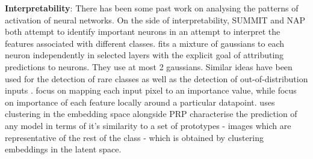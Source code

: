\documentclass{article}
\begin{document}
            \textbf{Interpretability}: There has been some past work on analysing the patterns of activation of neural networks. On the side of interpretability, SUMMIT \cite{hohman2019summitscalingdeeplearning} and NAP \cite{bauerle2022neuralactivationpatternsnaps} both attempt to identify important neurons in an attempt to interpret the features associated with different classes. \cite{stano2020explainingpredictionsdeepneural} fits a mixture of gaussians to each neuron independently in selected layers with the explicit goal of attributing predictions to neurons. They use at most 2 gaussians. Similar ideas have been used for the detection of rare classes \cite{paterson2021detectionmitigationraresubclasses} as well as the detection of out-of-distribution inputs \cite{olber2023detectionoutofdistributionsamplesusing}. \cite{simonyan2014deepinsideconvolutionalnetworks, faaaf4beb6f24ca599a7ecae54e0c724, Selvaraju_2019, gautam2021lookslikethatenhancing} focus on mapping each input pixel to an importance value, while \cite{ribeiro2016whyitrustyou, lundberg2017unifiedapproachinterpretingmodel} focus on importance of each feature locally around a particular datapoint. \cite{gautam2024prototypicalselfexplainablemodelsretraining} uses clustering in the embedding space alongside PRP \cite{gautam2021lookslikethatenhancing} characterise the prediction of any model in terms of it's similarity to a set of prototypes - images which are representative of the rest of the class - which is obtained by clustering embeddings in the latent space.
            
\end{document}
